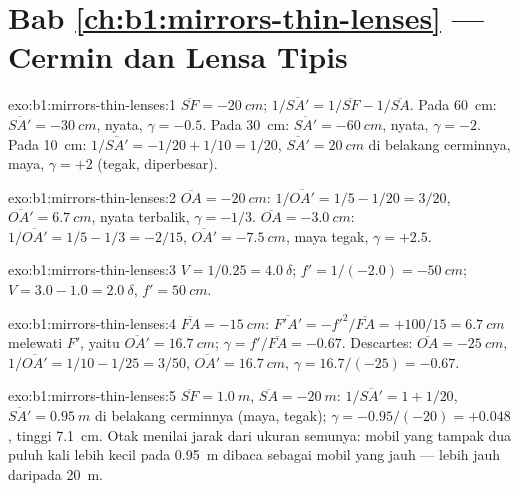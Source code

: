 \section*{Bab \ref{ch:b1:mirrors-thin-lenses} --- Cermin dan Lensa Tipis}

\begin{solution}{exo:b1:mirrors-thin-lenses:1}
$\overline{SF} = \qty{-20}{cm}$; $1/\overline{SA'} = 1/\overline{SF} -
1/\overline{SA}$. Pada \qty{60}{cm}: $\overline{SA'} = \qty{-30}{cm}$,
nyata, $\gamma = -0.5$. Pada \qty{30}{cm}: $\overline{SA'} = \qty{-60}{cm}$,
nyata, $\gamma = -2$. Pada \qty{10}{cm}: $1/\overline{SA'} = -1/20 + 1/10
= 1/20$, $\overline{SA'} = \qty{+20}{cm}$ di belakang cerminnya, maya,
$\gamma = +2$ (tegak, diperbesar).
\end{solution}

\begin{solution}{exo:b1:mirrors-thin-lenses:2}
$\overline{OA} = \qty{-20}{cm}$: $1/\overline{OA'} = 1/5 - 1/20 = 3/20$,
$\overline{OA'} = \qty{+6.7}{cm}$, nyata terbalik, $\gamma = -1/3$.
$\overline{OA} = \qty{-3.0}{cm}$: $1/\overline{OA'} = 1/5 - 1/3 = -2/15$,
$\overline{OA'} = \qty{-7.5}{cm}$, maya tegak, $\gamma = +2.5$.
\end{solution}

\begin{solution}{exo:b1:mirrors-thin-lenses:3}
$V = 1/0.25 = \qty{+4.0}{\delta}$; $f' = 1/(-2.0) = \qty{-50}{cm}$;
$V = 3.0 - 1.0 = \qty{+2.0}{\delta}$, $f' = \qty{50}{cm}$.
\end{solution}

\begin{solution}{exo:b1:mirrors-thin-lenses:4}
$\overline{FA} = \qty{-15}{cm}$: $\overline{F'A'} = -f'^2/\overline{FA}
= +100/15 = \qty{6.7}{cm}$ melewati $F'$, yaitu $\overline{OA'} = \qty{16.7}{cm}$;
$\gamma = f'/\overline{FA} = -0.67$. Descartes: $\overline{OA} =
\qty{-25}{cm}$, $1/\overline{OA'} = 1/10 - 1/25 = 3/50$,
$\overline{OA'} = \qty{16.7}{cm}$, $\gamma = 16.7/(-25) = -0.67$.
\end{solution}

\begin{solution}{exo:b1:mirrors-thin-lenses:5}
$\overline{SF} = \qty{+1.0}{m}$, $\overline{SA} = \qty{-20}{m}$:
$1/\overline{SA'} = 1 + 1/20$, $\overline{SA'} = \qty{0.95}{m}$ di
belakang cerminnya (maya, tegak); $\gamma = -0.95/(-20) = +0.048$,
tinggi  \qty{7.1}{cm}. Otak menilai jarak dari ukuran
semunya: mobil yang tampak dua puluh kali lebih kecil pada \qty{0.95}{m}
dibaca sebagai mobil yang jauh --- lebih jauh daripada \qty{20}{m}.
\end{solution}

